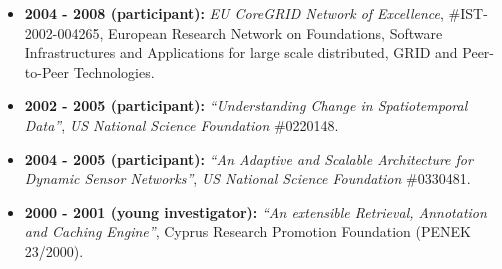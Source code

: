 \documentclass[10pt]{article}
\begin{document}
\begin{itemize}
\item {\bf 2004 - 2008 (participant):} {\em EU CoreGRID Network of Excellence}, \#IST-2002-004265, European Research Network on Foundations, Software Infrastructures and Applications for large scale distributed, GRID and Peer-to-Peer Technologies.

\item  {\bf 2002 - 2005 (participant):} {\em ``Understanding Change in Spatiotemporal Data''}, {\em US National Science Foundation} \#0220148.

\item {\bf 2004 - 2005 (participant):} {\em ``An Adaptive and Scalable Architecture for Dynamic Sensor Networks''}, {\em US National Science Foundation} \#0330481.

\item {\bf 2000 - 2001 (young investigator):} {\em ``An extensible Retrieval, Annotation and Caching Engine''}, Cyprus Research Promotion Foundation (PENEK 23/2000).

\end{itemize}



\newpage
\renewcommand{\labelitemi}{$\bullet$}
\end{document}
